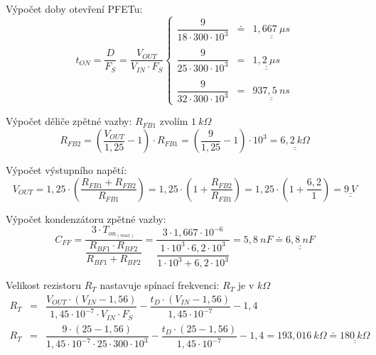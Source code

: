Výpočet doby otevření PFETu:
\begin{equation}
t_{ON} = \dfrac{D}{F_{S}} = \dfrac{V_{OUT}}{V_{IN} \cdot F_S} 
\left\lbrace
\begin{array}{ccl}
\dfrac{9}{18 \cdot 300 \cdot 10^{3}} & \doteq & \underline{\underline{1,667~\mu s}} \\\\
\dfrac{9}{25 \cdot 300 \cdot 10^{3}} & = & \underline{\underline{1,2~\mu s}} \\\\
\dfrac{9}{32 \cdot 300 \cdot 10^{3}} & = & \underline{\underline{937,5~ns}}
\end{array}
\right.
\nonumber
\end{equation}

Výpočet děliče zpětné vazby: $R_{FB1}$ zvolím $1~k\Omega$
\begin{equation}
R_{FB2} = \left( \dfrac{V_{OUT}}{1,25} - 1 \right) \cdot R_{FB1} = \left( \dfrac{9}{1,25} -1 \right) \cdot 10^{3} = \underline{\underline{6,2~k\Omega}}
\nonumber
\end{equation}


Výpočet výstupního napětí:
\begin{equation}
V_{OUT} = 1,25 \cdot \left( \dfrac{R_{FB1} + R_{FB2}}{R_{FB1}} \right) = 1,25 \cdot \left(1 + \dfrac{R_{FB2}}{R_{FB1}} \right) = 1,25 \cdot \left( 1+ \dfrac{6,2}{1} \right) = \underline{\underline{9~V}}
\nonumber
\end{equation}

Výpočet kondenzátoru zpětné vazby:
\begin{equation}
C_{FF} = \dfrac{3 \cdot T_{on_{(max)}}}{\dfrac{R_{BF1} \cdot R_{BF2}}{R_{BF1} + R_{BF2}}} =
 \dfrac{3 \cdot 1,667 \cdot 10^{-6}}{\dfrac{1 \cdot 10^{3} \cdot 6,2 \cdot 10^{3}}{1 \cdot 10^{3} + 6,2 \cdot 10^{3}}} = 5,8~nF \doteq \underline{\underline{6,8~nF}}
\nonumber
\end{equation}

Velikost rezistoru $R_T$ nastavuje spínací frekvenci: $R_T$ je v $k\Omega$
\begin{eqnarray}
R_T &=& \dfrac{V_{OUT} \cdot (V_{IN} - 1,56)}{1,45 \cdot 10^{-7} \cdot V_{IN} \cdot F_S} - \dfrac{t_D \cdot (V_{IN} - 1,56)}{1,45 \cdot 10^{-7}} - 1,4 \nonumber\\
R_T &=& \dfrac{9 \cdot (25 - 1,56)}{1,45 \cdot 10^{-7} \cdot 25 \cdot 300 \cdot 10^{3}} - \dfrac{t_D \cdot (25 - 1,56)}{1,45 \cdot 10^{-7}} - 1,4 = 193,016~k\Omega \doteq \underline{\underline{180~k\Omega}}
\nonumber
\end{eqnarray}


